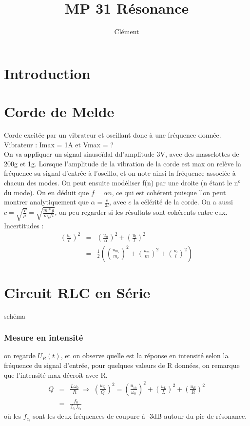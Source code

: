 \documentclass[12pt,prb,aps,epsf]{report}
\begin{document}
	
	\title{MP 31 Résonance}
	\author{Clément}
	
	\maketitle
	
	\tableofcontents
	
	\pagebreak
	
	
\section{Introduction}

\section{Corde de Melde}

Corde excitée par un vibrateur et oscillant donc à une fréquence donnée.\\
Vibrateur : Imax = 1A et Vmax = ?\\
On va appliquer un signal sinusoïdal dd'amplitude 3V, avec des masselottes de 200g et 1g.
Lorsque l'amplitude de la vibration de la corde est max on relève la fréquence su signal d'entrée à l'oscillo, et on note ainsi la fréquence associée à chacun des modes. On peut ensuite modéliser f(n) par une droite (n étant le n° du mode). On en déduit que $f = \alpha n$, ce qui est cohérent puisque l'on peut montrer analytiquement que $\alpha =\frac{c}{2l}$, avec $c$ la célérité de la corde. On a aussi $c=\sqrt{\frac{T}{\mu}}=\sqrt{\frac{m*g}{m_c/l}}$, on peu regarder si les résultats sont cohérents entre eux.\\
Incertitudes :
\begin{eqnarray}
\left(\frac{u_c}{c}\right)^2 &=& \left(\frac{u_{\alpha}}{\alpha}\right)^2+\left(\frac{u_l}{l}\right)^2\\
&=& \frac{1}{2}\left( \left(\frac{u_{m_c}}{m_c}\right)^2+\left(\frac{u_m}{m}\right)^2+\left(\frac{u_l}{l}\right)^2\right)
\end{eqnarray}

\section{Circuit RLC en Série}
schéma\\
\subsubsection{Mesure en intensité}
on regarde $U_R(t)$, et on observe quelle est la réponse en intensité selon la fréquence du signal d'entrée, pour quelques valeurs de R données, on remarque que l'intensité max décroît avec R.\\
\begin{eqnarray}
Q&=&\frac{L\omega_0}{R} \; \Rightarrow \; \left(\frac{u_Q}{Q}\right)^2 = \left(\frac{u_{\omega_0}}{\omega_0}\right)^2+\left(\frac{u_L}{L}\right)^2+\left(\frac{u_R}{R}\right)^2\\
&=& \frac{f_0}{f_{c_1}f_{c_2}}
\end{eqnarray}
où les $f_{c_i}$ sont les deux fréquences de coupure à -3dB autour du pic de résonance.
\end{document}
